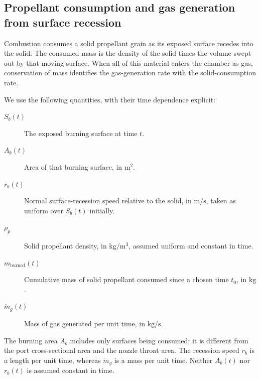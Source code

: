 \subsection{Propellant consumption and gas generation from surface recession}
\label{sec:sb-mass-kinematics}
\label{sec:sb-sutton-mass}
Combustion consumes a solid propellant grain as its exposed surface
recedes into the solid. The consumed mass is the density of the solid
times the volume swept out by that moving surface. When all of this
material enters the chamber as gas, conservation of mass identifies the
gas-generation rate with the solid-consumption rate.

We use the following quantities, with their time dependence explicit:
\begin{description}
\item[$S_b(t)$] The exposed burning surface at time $t$.
\item[$A_b(t)$] Area of that burning surface, in $\mathrm m^2$.
\item[$r_b(t)$] Normal surface-recession speed relative to the solid,
in $\mathrm m/\mathrm s$, taken as uniform over $S_b(t)$ initially.
\item[$\rho_p$] Solid propellant density, in $\mathrm{kg}/\mathrm m^3$,
assumed uniform and constant in time.
\item[$m_{\mathrm{burned}}(t)$] Cumulative mass of solid propellant
consumed since a chosen time $t_0$, in $\mathrm{kg}$.
\item[$\dot m_g(t)$] Mass of gas generated per unit time,
in $\mathrm{kg}/\mathrm s$.
\end{description}
The burning area $A_b$ includes only surfaces being consumed; it is
different from the port cross-sectional area and the nozzle throat area.
The recession speed $r_b$ is a length per unit time, whereas
$\dot m_g$ is a mass per unit time. Neither $A_b(t)$ nor
$r_b(t)$ is assumed constant in time.

